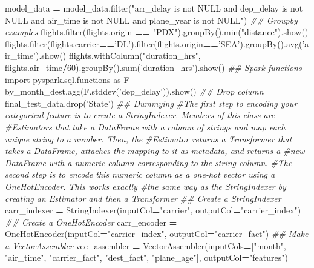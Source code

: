 \documentclass[]{book}
\newenvironment{Shaded}{\begin{snugshade}}{\end{snugshade}}
\newcommand{\BuiltInTok}[1]{#1}
\newcommand{\CommentTok}[1]{\textcolor[rgb]{0.56,0.35,0.01}{\textit{#1}}}
\newcommand{\DecValTok}[1]{\textcolor[rgb]{0.00,0.00,0.81}{#1}}
\newcommand{\ImportTok}[1]{#1}
\newcommand{\NormalTok}[1]{#1}
\newcommand{\OperatorTok}[1]{\textcolor[rgb]{0.81,0.36,0.00}{\textbf{#1}}}
\newcommand{\StringTok}[1]{\textcolor[rgb]{0.31,0.60,0.02}{#1}}
\begin{document}
\begin{Shaded}
\begin{Highlighting}[]
\NormalTok{model_data }\OperatorTok{=}\NormalTok{ model_data.}\BuiltInTok{filter}\NormalTok{(}\StringTok{"arr_delay is not NULL and dep_delay is not NULL and air_time is not NULL and plane_year is not NULL"}\NormalTok{)}
\CommentTok{## Groupby examples}
\NormalTok{flights.}\BuiltInTok{filter}\NormalTok{(flights.origin }\OperatorTok{==} \StringTok{"PDX"}\NormalTok{).groupBy().}\BuiltInTok{min}\NormalTok{(}\StringTok{"distance"}\NormalTok{).show()}
\NormalTok{flights.}\BuiltInTok{filter}\NormalTok{(flights.carrier}\OperatorTok{==}\StringTok{'DL'}\NormalTok{).}\BuiltInTok{filter}\NormalTok{(flights.origin}\OperatorTok{==}\StringTok{'SEA'}\NormalTok{).groupBy().avg(}\StringTok{'air_time'}\NormalTok{).show()}
\NormalTok{flights.withColumn(}\StringTok{"duration_hrs"}\NormalTok{, flights.air_time}\OperatorTok{/}\DecValTok{60}\NormalTok{).groupBy().}\BuiltInTok{sum}\NormalTok{(}\StringTok{'duration_hrs'}\NormalTok{).show()}
\CommentTok{## Spark functions}
\ImportTok{import}\NormalTok{ pyspark.sql.functions }\ImportTok{as}\NormalTok{ F}
\NormalTok{by_month_dest.agg(F.stddev(}\StringTok{'dep_delay'}\NormalTok{)).show()}
\CommentTok{## Drop column}
\NormalTok{final_test_data.drop(}\StringTok{'State'}\NormalTok{)}
\CommentTok{## Dummying}
\CommentTok{#The first step to encoding your categorical feature is to create a StringIndexer. Members of this class are #Estimators that take a DataFrame with a column of strings and map each unique string to a number. Then, the #Estimator returns a Transformer that takes a DataFrame, attaches the mapping to it as metadata, and returns a #new DataFrame with a numeric column corresponding to the string column.}
\CommentTok{#The second step is to encode this numeric column as a one-hot vector using a OneHotEncoder. This works exactly #the same way as the StringIndexer by creating an Estimator and then a Transformer}
\CommentTok{## Create a StringIndexer}
\NormalTok{carr_indexer }\OperatorTok{=}\NormalTok{ StringIndexer(inputCol}\OperatorTok{=}\StringTok{"carrier"}\NormalTok{, outputCol}\OperatorTok{=}\StringTok{"carrier_index"}\NormalTok{)}
\CommentTok{## Create a OneHotEncoder}
\NormalTok{carr_encoder }\OperatorTok{=}\NormalTok{ OneHotEncoder(inputCol}\OperatorTok{=}\StringTok{"carrier_index"}\NormalTok{, outputCol}\OperatorTok{=}\StringTok{"carrier_fact"}\NormalTok{)}
\CommentTok{## Make a VectorAssembler}
\NormalTok{vec_assembler }\OperatorTok{=}\NormalTok{ VectorAssembler(inputCols}\OperatorTok{=}\NormalTok{[}\StringTok{"month"}\NormalTok{, }\StringTok{"air_time"}\NormalTok{, }\StringTok{"carrier_fact"}\NormalTok{, }\StringTok{"dest_fact"}\NormalTok{, }\StringTok{"plane_age"}\NormalTok{], outputCol}\OperatorTok{=}\StringTok{"features"}\NormalTok{)}

\end{Highlighting}
\end{Shaded}
\end{document}
